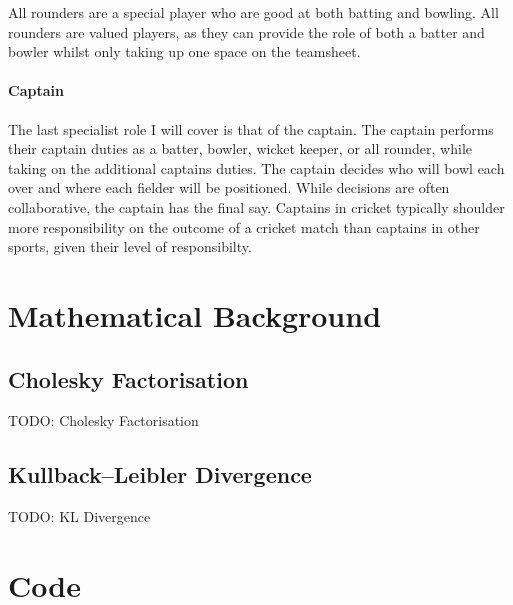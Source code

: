 \documentclass[12pt,a4paper]{report}
\theoremstyle{definition}
\begin{document}
All rounders are a special player who are good at both batting and bowling.
All rounders are valued players, as they can provide the role of both a batter and bowler whilst only taking up one space on the teamsheet.

\subsubsection{Captain}

The last specialist role I will cover is that of the captain. 
The captain performs their captain duties as a batter, bowler, wicket keeper, or all rounder, while taking on the additional captains duties.
The captain decides who will bowl each over and where each fielder will be positioned. 
While decisions are often collaborative, the captain has the final say.
Captains in cricket typically shoulder more responsibility on the outcome of a cricket match than captains in other sports, given their level of responsibilty.

\chapter{Mathematical Background}

\section{Cholesky Factorisation} \label{sec:CholFac}

TODO: Cholesky Factorisation

\section{Kullback–Leibler Divergence} \label{sec:KLDiv}

TODO: KL Divergence

\chapter{Code}

\end{document}
